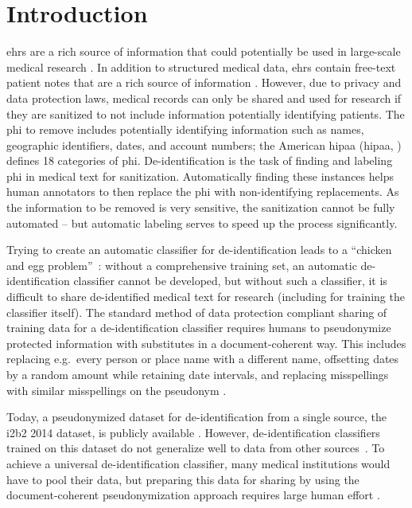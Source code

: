 

\section{Introduction}\label{sec:introduction}
%
\Acp{ehr} are a rich source of information that could potentially be used in large-scale medical research \citep{botsis2010secondary, birkhead2015uses, cowie2017electronic}.
%
In addition to structured medical data, \acp{ehr} contain free-text patient notes that are a rich source of information \citep{jensen2012mining}.
%
However, due to privacy and data protection laws, medical records can only be shared and used for research if they are sanitized to not include information potentially identifying patients.
%
The \ac{phi} to remove includes potentially identifying information such as names, geographic identifiers, dates, and account numbers; the American \acl{hipaa} (\acs{hipaa}, \citeyear{usa1996hipaa}) defines 18 categories of \ac{phi}.
%
De-identification is the task of finding and labeling \ac{phi} in medical text for sanitization.
Automatically finding these instances helps human annotators to then replace the \ac{phi} with
non-identifying replacements.  As the information to be removed is very sensitive, the sanitization
cannot be fully automated -- but automatic labeling serves to speed up the process significantly.

%
Trying to create an automatic classifier for de-identification leads to a ``chicken and egg problem''~\citep{uzuner2007evaluating}: without a comprehensive training set, an automatic de-identification classifier cannot be developed, but without such a classifier, it is difficult to share de-identified medical text for research (including for training the classifier itself).
%
The standard method of data protection compliant sharing of training data for a de-identification classifier requires humans to pseudonymize protected information with substitutes in a document-coherent way.
%
This includes replacing e.g.\ every person or place name with a different name, offsetting dates by a random amount while retaining date intervals, and replacing misspellings with similar misspellings on the pseudonym \cite{uzuner2007evaluating}.

%
Today, a pseudonymized dataset for de-identification from a single source, the i2b2 2014 dataset, is publicly available \citep{stubbs2015annotating}.
%
However, de-identification classifiers trained on this dataset do not generalize well to data from other sources~\citep{stubbs2017identification}.
%
To achieve a universal de-identification classifier, many medical institutions would have to pool their data, but
%
preparing this data for sharing by using the document-coherent pseudonymization approach requires large human effort \citep{dernoncourt2017identification}.

